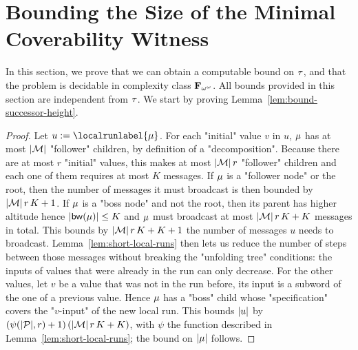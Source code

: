 \section{Bounding the Size of the Minimal Coverability Witness}
\label{app:proofs_bounds}

In this section, we prove that we can obtain a computable bound on $\tau$, and that the problem is decidable in complexity class $\mathbf{F}_{\omega^\omega}$. All bounds provided in this section are independent from $\tau$. 
We start by proving Lemma~\ref{lem:bound-successor-height}.

\lemBoundSuccessorHeight*

\begin{proof}
	Let $u := \localrunlabel{\node}$. For each "initial" value $v$ in $u$, $\mu$ has at most $|\mathcal{M}|$ "follower" children, by definition of a "decomposition".
	Because there are at most $r$ "initial" values, this makes at most $|\mathcal{M}| \, r$ "follower" children and each one of them requires at most $K$ messages. If $\mu$ is a "follower node" or the root, then the number of messages it must broadcast is then bounded by $|\mathcal{M}| \, r \, K +1$. If $\mu$ is a "boss node" and not the root, then its parent
	has higher altitude hence $|\mathsf{bw}(\mu)| \leq K$ and $\mu$ must broadcast at most $|\mathcal{M}| \, r \, K + K$ messages in total.
	This bounds by $|\mathcal{M}| \, r \, K + K +1$ the number of messages $u$ needs to broadcast. Lemma~\ref{lem:short-local-runs} then lets us reduce the number of steps between those messages without breaking the "unfolding tree" conditions: the inputs of values that were already in the run can only decrease. For the other values, let $v$ be a value that was not in the run before, its input is a subword of the one of a previous value. Hence $\mu$ has a "boss" child whose "specification" covers the "$v$-input" of the new local run. 
	This bounds $|u|$ by $(\psi(|\mathcal{P}|,r)+1) \, (|\mathcal{M}|\, r \, K + K)$, with $\psi$ the function described in Lemma~\ref{lem:short-local-runs}; the bound on $|\mu|$ follows.
\end{proof}



